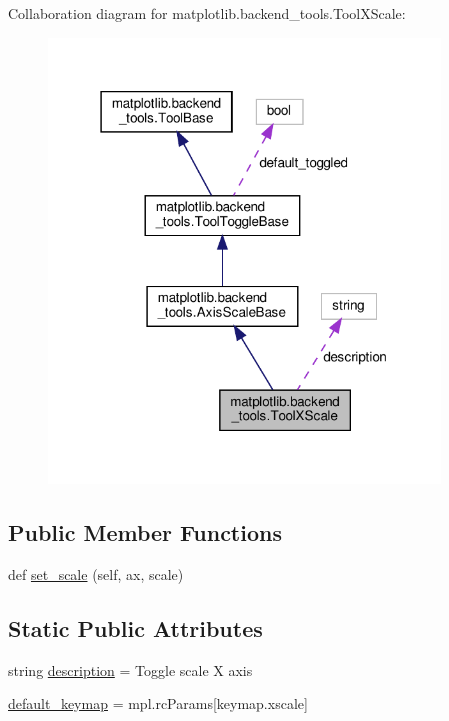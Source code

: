Collaboration diagram for matplotlib.\+backend\+\_\+tools.\+Tool\+X\+Scale\+:
\nopagebreak
\begin{figure}[H]
\begin{center}
\leavevmode
\includegraphics[width=295pt]{classmatplotlib_1_1backend__tools_1_1ToolXScale__coll__graph}
\end{center}
\end{figure}
\subsection*{Public Member Functions}
\begin{DoxyCompactItemize}
\item 
def \hyperlink{classmatplotlib_1_1backend__tools_1_1ToolXScale_a2474b721422ea8fe9ad465a2605829b4}{set\+\_\+scale} (self, ax, scale)
\end{DoxyCompactItemize}
\subsection*{Static Public Attributes}
\begin{DoxyCompactItemize}
\item 
string \hyperlink{classmatplotlib_1_1backend__tools_1_1ToolXScale_a350c1b538b8873f1e4e2689fb9d27cc9}{description} = \textquotesingle{}Toggle scale X axis\textquotesingle{}
\item 
\hyperlink{classmatplotlib_1_1backend__tools_1_1ToolXScale_a262277b6ca324bbdca4e2de4fc503dcc}{default\+\_\+keymap} = mpl.\+rc\+Params\mbox{[}\textquotesingle{}keymap.\+xscale\textquotesingle{}\mbox{]}
\end{DoxyCompactItemize}


